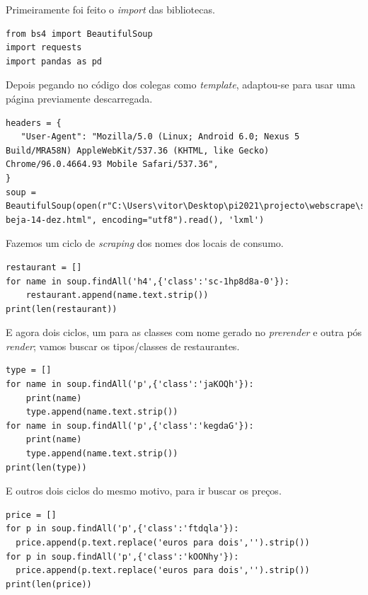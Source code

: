 \documentclass[a4paper,10pt]{article}
\begin{document}
Primeiramente foi feito o \textit{import} das bibliotecas.

\begin{verbatim}
from bs4 import BeautifulSoup
import requests
import pandas as pd
\end{verbatim}

Depois pegando no código dos colegas como \textit{template}, adaptou-se para usar uma página previamente descarregada.

\begin{verbatim}
headers = {
   "User-Agent": "Mozilla/5.0 (Linux; Android 6.0; Nexus 5 Build/MRA58N) AppleWebKit/537.36 (KHTML, like Gecko) Chrome/96.0.4664.93 Mobile Safari/537.36",
}
soup = BeautifulSoup(open(r"C:\Users\vitor\Desktop\pi2021\projecto\webscrape\scrapes\zomato\restaurantes\zomato-beja-14-dez.html", encoding="utf8").read(), 'lxml')
\end{verbatim}

Fazemos um ciclo de \textit{scraping} dos nomes dos locais de consumo.

\begin{verbatim}
restaurant = []
for name in soup.findAll('h4',{'class':'sc-1hp8d8a-0'}):
    restaurant.append(name.text.strip())
print(len(restaurant))
\end{verbatim}

E agora dois ciclos, um para as classes com nome gerado no \textit{prerender} e outra pós \textit{render}; vamos buscar os tipos/classes de restaurantes.

\begin{verbatim}
type = []
for name in soup.findAll('p',{'class':'jaKOQh'}):
    print(name)
    type.append(name.text.strip())
for name in soup.findAll('p',{'class':'kegdaG'}):
    print(name)
    type.append(name.text.strip())
print(len(type))
\end{verbatim}

E outros dois ciclos do mesmo motivo, para ir buscar os preços.

\begin{verbatim}
price = []
for p in soup.findAll('p',{'class':'ftdqla'}):
  price.append(p.text.replace('euros para dois','').strip())
for p in soup.findAll('p',{'class':'kOONhy'}):
  price.append(p.text.replace('euros para dois','').strip())
print(len(price))
\end{verbatim}
\end{document}
